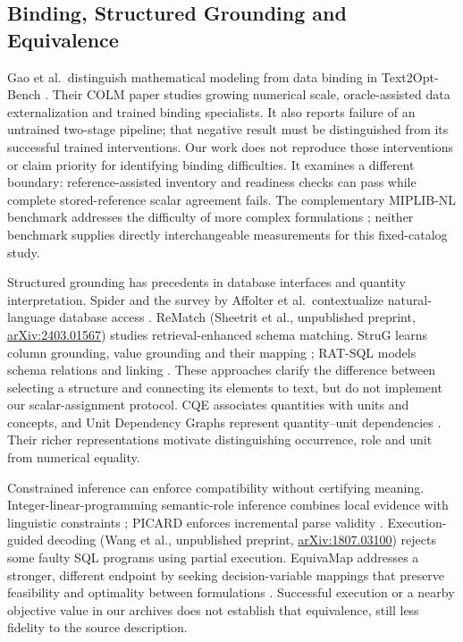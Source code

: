 \documentclass[pdflatex,iicol,sn-basic,Numbered]{sn-jnl}
\begin{document}
\subsection{Binding, Structured Grounding and Equivalence}
\label{subsec:rw_binding}
Gao et al.\ distinguish mathematical modeling from data binding in Text2Opt-Bench \cite{gao2026models}. Their COLM paper studies growing numerical scale, oracle-assisted data externalization and trained binding specialists. It also reports failure of an untrained two-stage pipeline; that negative result must be distinguished from its successful trained interventions. Our work does not reproduce those interventions or claim priority for identifying binding difficulties. It examines a different boundary: reference-assisted inventory and readiness checks can pass while complete stored-reference scalar agreement fails. The complementary MIPLIB-NL benchmark addresses the difficulty of more complex formulations \cite{miplibnl2026}; neither benchmark supplies directly interchangeable measurements for this fixed-catalog study.

Structured grounding has precedents in database interfaces and quantity interpretation. Spider and the survey by Affolter et al.\ contextualize natural-language database access \cite{yu2018spider,affolter2019nli}. ReMatch (Sheetrit et al., unpublished preprint, \href{https://arxiv.org/abs/2403.01567}{arXiv:2403.01567}) studies retrieval-enhanced schema matching. StruG learns column grounding, value grounding and their mapping \cite{deng2021strug}; RAT-SQL models schema relations and linking \cite{wang2020ratsql}. These approaches clarify the difference between selecting a structure and connecting its elements to text, but do not implement our scalar-assignment protocol. CQE associates quantities with units and concepts, and Unit Dependency Graphs represent quantity--unit dependencies \cite{almasian2023cqe,roy2017udg}. Their richer representations motivate distinguishing occurrence, role and unit from numerical equality.

Constrained inference can enforce compatibility without certifying meaning. Integer-linear-programming semantic-role inference combines local evidence with linguistic constraints \cite{punyakanok2004ilp}; PICARD enforces incremental parse validity \cite{scholak2021picard}. Execution-guided decoding (Wang et al., unpublished preprint, \href{https://arxiv.org/abs/1807.03100}{arXiv:1807.03100}) rejects some faulty SQL programs using partial execution. EquivaMap addresses a stronger, different endpoint by seeking decision-variable mappings that preserve feasibility and optimality between formulations \cite{zhai2025equivamap}. Successful execution or a nearby objective value in our archives does not establish that equivalence, still less fidelity to the source description.
\end{document}

